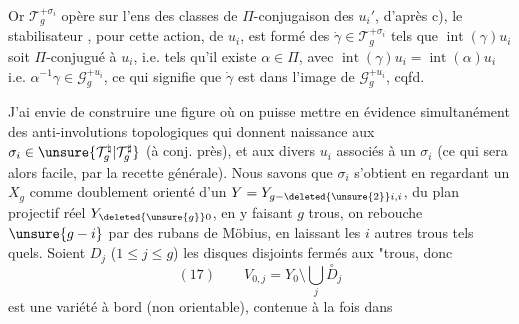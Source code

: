 Or $\mathcal{T}_g^{+\sigma_i}$ opère  sur l'ens des
classes de $\Pi$-conjugaison des $u_i'$, d'après
c),  le stabilisateur , pour cette
action, de $u_i$, est formé des $\dot\gamma\in\mathcal{T}_g^{+\sigma_i}$
tels que  $\operatorname{int}(\gamma)u_i$ soit $\Pi$-conjugué
à $u_i$, i.e. tels qu'il existe $\alpha\in\Pi$, avec
$\operatorname{int}(\gamma)u_i=\operatorname{int}(\alpha)u_i$ i.e. $\alpha^{-1}\gamma\in\mathcal{G}_g^{+u_i}$, ce qui
signifie que $\dot\gamma$ est dans l'image de $\mathcal{G}_g^{+u_i}$,
cqfd.

J'ai envie de construire une figure  où
on puisse mettre en évidence simultanément
des anti-involutions topologiques
qui  donnent naissance aux
$\sigma_i\in\unsure{\mathcal{T}_g^{\natural}|\mathcal{T}_g^{\sharp}}$ (à conj. près), et aux divers
$u_i$  associés à un $\sigma_i$ (ce qui sera alors
facile, par la recette générale). Nous
savons que $\sigma_i$  s'obtient en regardant
un $X_g$ comme doublement orienté
d'un $Y=Y_{g-\deleted{\unsure{2}}i,i}$, 
du  plan projectif réel $Y_{\deleted{\unsure{g}}0}$, en
y faisant $g$ trous,  on  rebouche
$\unsure{g-i}$ par des rubans de Möbius, en
laissant les $i$ autres trous tels quels.
Soient $D_j$ ($1\le j\le g$) les disques disjoints
fermés  aux "trous, donc
\[
(17)\qquad \boxed{V_{0,j}=Y_0\setminus\bigcup_j \overset{\circ}{D}_j}
\]
est une variété à bord
(non orientable), contenue à la fois dans
